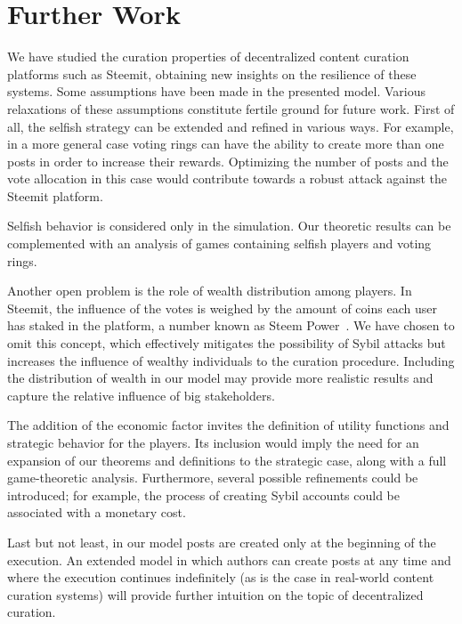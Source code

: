 \section{Further Work}

  We have studied the curation properties of decentralized content curation
  platforms such as Steemit, obtaining new insights on the resilience of these
  systems. Some assumptions have been made in the presented model. Various
  relaxations of these assumptions constitute fertile ground for future work.
  First of all, the selfish strategy can be extended and refined in various
  ways. For example, in a more general case voting rings can have the ability to
  create more than one posts in order to increase their rewards. Optimizing the
  number of posts and the vote allocation in this case would contribute towards
  a robust attack against the Steemit platform.

  Selfish behavior is considered only in the simulation. Our theoretic results
  can be complemented with an analysis of games containing selfish players and
  voting rings.

  Another open problem is the role of wealth distribution among players. In
  Steemit, the influence of the votes is weighed by the amount of coins each
  user has staked in the platform, a number known as Steem Power~\cite{steemit}.
  We have chosen to omit this concept, which effectively mitigates the
  possibility of Sybil attacks but increases the influence of wealthy
  individuals to the curation procedure. Including the distribution of wealth in
  our model may provide more realistic results and capture the relative
  influence of big stakeholders.

  The addition of the economic factor invites the definition of utility
  functions and strategic behavior for the players. Its inclusion would imply
  the need for an expansion of our theorems and definitions to the strategic
  case, along with a full game-theoretic analysis. Furthermore, several possible
  refinements could be introduced; for example, the process of creating Sybil
  accounts could be associated with a monetary cost.

  Last but not least, in our model posts are created only at the beginning of
  the execution. An extended model in which authors can create posts at any time
  and where the execution continues indefinitely (as is the case in real-world
  content curation systems) will provide further intuition on the topic of
  decentralized curation.
